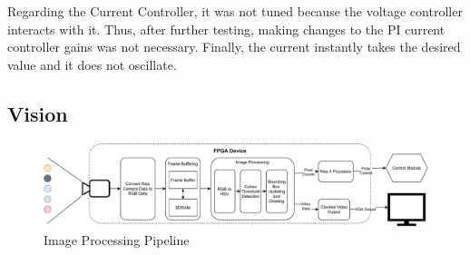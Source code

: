 \documentclass[a4paper]{article}
\begin{document}

Regarding the Current Controller, it was not tuned because the voltage controller
 interacts with it. Thus, after further testing, making changes to the PI current
  controller gains was not necessary. Finally, the current instantly takes the 
  desired value and it does not oscillate. 






\subsection{Vision}
\begin{figure}[!htbp]
    \centering
    \includegraphics[width = \textwidth]{./media/ImageProcessingStream.pdf}
    \caption{Image Processing Pipeline}
    \label{fig:ImageProcPipeline}
\end{figure}
\end{document}
